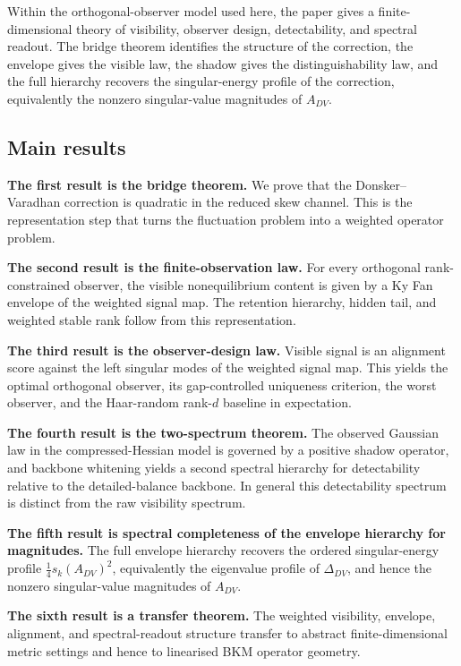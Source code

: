 \documentclass[11pt,a4paper]{article}
\numberwithin{equation}{section}
\theoremstyle{thmcompact}
\theoremstyle{remark}
\begin{document}
Within the orthogonal-observer model used here, the paper gives a finite-dimensional theory of visibility, observer design, detectability, and spectral readout. The bridge theorem identifies the structure of the correction, the envelope gives the visible law, the shadow gives the distinguishability law, and the full hierarchy recovers the singular-energy profile of the correction, equivalently the nonzero singular-value magnitudes of \(A_{DV}\).

\subsection{Main results}

\textbf{The first result is the bridge theorem.} We prove that the Donsker--Varadhan correction is quadratic in the reduced skew channel. This is the representation step that turns the fluctuation problem into a weighted operator problem.

\textbf{The second result is the finite-observation law.} For every orthogonal rank-constrained observer, the visible nonequilibrium content is given by a Ky Fan envelope of the weighted signal map. The retention hierarchy, hidden tail, and weighted stable rank follow from this representation.

\textbf{The third result is the observer-design law.} Visible signal is an alignment score against the left singular modes of the weighted signal map. This yields the optimal orthogonal observer, its gap-controlled uniqueness criterion, the worst observer, and the Haar-random rank-\(d\) baseline in expectation.

\textbf{The fourth result is the two-spectrum theorem.} The observed Gaussian law in the compressed-Hessian model is governed by a positive shadow operator, and backbone whitening yields a second spectral hierarchy for detectability relative to the detailed-balance backbone. In general this detectability spectrum is distinct from the raw visibility spectrum.

\textbf{The fifth result is spectral completeness of the envelope hierarchy for magnitudes.} The full envelope hierarchy recovers the ordered singular-energy profile \(\tfrac14 s_k(A_{DV})^2\), equivalently the eigenvalue profile of \(\Delta_{DV}\), and hence the nonzero singular-value magnitudes of \(A_{DV}\).

\textbf{The sixth result is a transfer theorem.} The weighted visibility, envelope, alignment, and spectral-readout structure transfer to abstract finite-dimensional metric settings and hence to linearised BKM operator geometry.
\end{document}
